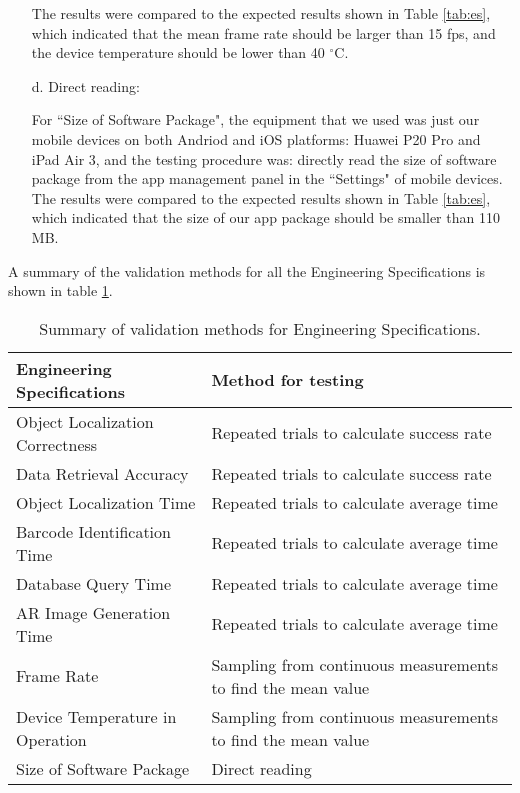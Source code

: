 \documentclass[11pt,a4paper]{article}
\begin{document}
\begin{onehalfspace}
\begin{itemize}
	The results were compared to the expected results shown in Table \ref{tab:es}, which indicated that the mean frame rate should be larger than 15 fps, and the device temperature should be lower than 40 $^\circ$C.
    
    \item[d.] Direct reading:
    
    For ``Size of Software Package", the equipment that we used was just our mobile devices on both Andriod and iOS platforms: Huawei P20 Pro and iPad Air 3, and the testing procedure was: directly read the size of software package from the app management panel in the ``Settings" of mobile devices. The results were compared to the expected results shown in Table \ref{tab:es}, which indicated that the size of our app package should be smaller than 110 MB.
\end{itemize}

A summary of the validation methods for all the Engineering Specifications is shown in table \ref{validation}.

\setcounter{table}{12}
\begin{table}[H]
    \centering
    \caption{Summary of validation methods for Engineering Specifications.}
    \begin{tabular}{|l|p{9cm}|}
        \hline
        \textbf{Engineering Specifications} & \textbf{Method for testing}  \\
        \hline
        Object Localization Correctness & Repeated trials to calculate success rate \\
        \hline
        Data Retrieval Accuracy & Repeated trials to calculate success rate \\
        \hline
        Object Localization Time & Repeated trials to calculate average time\\
        \hline
        Barcode Identification Time & Repeated trials to calculate average time \\
        \hline
        Database Query Time & Repeated trials to calculate average time\\
        \hline
        AR Image Generation Time & Repeated trials to calculate average time \\
        \hline
        Frame Rate & Sampling from continuous measurements to find the mean value	\\
        \hline
        Device Temperature in Operation & Sampling from continuous measurements to find the mean value	\\
        \hline
        Size of Software Package & Direct reading\\
        \hline
    \end{tabular}
    \label{validation}
\end{table}


\end{onehalfspace}
\end{document}
